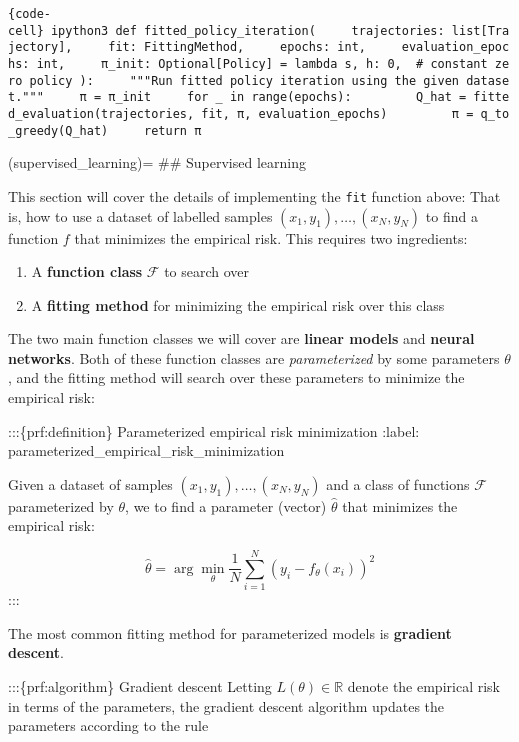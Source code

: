 \texttt{\{code-cell\}\ ipython3\ def\ fitted\_policy\_iteration(\ \ \ \ \ trajectories:\ list{[}Trajectory{]},\ \ \ \ \ fit:\ FittingMethod,\ \ \ \ \ epochs:\ int,\ \ \ \ \ evaluation\_epochs:\ int,\ \ \ \ \ π\_init:\ Optional{[}Policy{]}\ =\ lambda\ s,\ h:\ 0,\ \ \#\ constant\ zero\ policy\ ):\ \ \ \ \ """Run\ fitted\ policy\ iteration\ using\ the\ given\ dataset."""\ \ \ \ \ π\ =\ π\_init\ \ \ \ \ for\ \_\ in\ range(epochs):\ \ \ \ \ \ \ \ \ Q\_hat\ =\ fitted\_evaluation(trajectories,\ fit,\ π,\ evaluation\_epochs)\ \ \ \ \ \ \ \ \ π\ =\ q\_to\_greedy(Q\_hat)\ \ \ \ \ return\ π}

(supervised\_learning)= \#\# Supervised learning

This section will cover the details of implementing the \texttt{fit}
function above: That is, how to use a dataset of labelled samples
\((x_1, y_1), \dots, (x_N, y_N)\) to find a function \(f\) that
minimizes the empirical risk. This requires two ingredients:

\begin{enumerate}
\def\labelenumi{\arabic{enumi}.}
\tightlist
\item
  A \textbf{function class} \(\mathcal{F}\) to search over
\item
  A \textbf{fitting method} for minimizing the empirical risk over this
  class
\end{enumerate}

The two main function classes we will cover are \textbf{linear models}
and \textbf{neural networks}. Both of these function classes are
\emph{parameterized} by some parameters \(\theta\), and the fitting
method will search over these parameters to minimize the empirical risk:

:::\{prf:definition\} Parameterized empirical risk minimization :label:
parameterized\_empirical\_risk\_minimization

Given a dataset of samples \((x_1, y_1), \dots, (x_N, y_N)\) and a class
of functions \(\mathcal{F}\) parameterized by \(\theta\), we to find a
parameter (vector) \(\hat \theta\) that minimizes the empirical risk:

\[
\hat \theta = \arg\min_{\theta} \frac{1}{N} \sum_{i=1}^N (y_i - f_\theta(x_i))^2
\] :::

The most common fitting method for parameterized models is
\textbf{gradient descent}.

:::\{prf:algorithm\} Gradient descent Letting
\(L(\theta) \in \mathbb{R}\) denote the empirical risk in terms of the
parameters, the gradient descent algorithm updates the parameters
according to the rule

